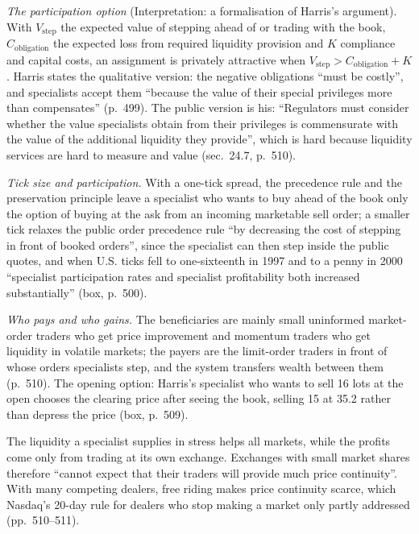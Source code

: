 \begin{qfdefinition}
 \emph{The participation option} (Interpretation: a formalisation of Harris's argument). With $V_{\mathrm{step}}$ the expected value of stepping ahead of or trading with the book, $C_{\mathrm{obligation}}$ the expected loss from required liquidity provision and $K$ compliance and capital costs, an assignment is privately attractive when $V_{\mathrm{step}}>C_{\mathrm{obligation}}+K$. Harris states the qualitative version: the negative obligations ``must be costly'', and specialists accept them ``because the value of their special privileges more than compensates'' (p.~499). The public version is his: ``Regulators must consider whether the value specialists obtain from their privileges is commensurate with the value of the additional liquidity they provide'', which is hard because liquidity services are hard to measure and value (sec.~24.7, p.~510).

\emph{Tick size and participation.} With a one-tick spread, the precedence rule and the preservation principle leave a specialist who wants to buy ahead of the book only the option of buying at the ask from an incoming marketable sell order; a smaller tick relaxes the public order precedence rule ``by decreasing the cost of stepping in front of booked orders'', since the specialist can then step inside the public quotes, and when U.S. ticks fell to one-sixteenth in 1997 and to a penny in 2000 ``specialist participation rates and specialist profitability both increased substantially'' (box, p.~500).

 \emph{Who pays and who gains.} The beneficiaries are mainly small uninformed market-order traders who get price improvement and momentum traders who get liquidity in volatile markets; the payers are the limit-order traders in front of whose orders specialists step, and the system transfers wealth between them (p.~510). The opening option: Harris's specialist who wants to sell 16 lots at the open chooses the clearing price after seeing the book, selling 15 at 35.2 rather than depress the price (box, p.~509).

The liquidity a specialist supplies in stress helps all markets, while the profits come only from trading at its own exchange. Exchanges with small market shares therefore ``cannot expect that their traders will provide much price continuity''. With many competing dealers, free riding makes price continuity scarce, which Nasdaq's 20-day rule for dealers who stop making a market only partly addressed (pp.~510--511).


\end{qfdefinition}
